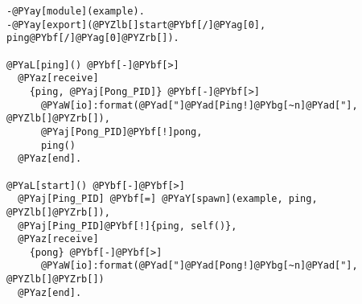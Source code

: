 \begin{Verbatim}[commandchars=@\[\]]
-@PYay[module](example).
-@PYay[export](@PYZlb[]start@PYbf[/]@PYag[0], ping@PYbf[/]@PYag[0]@PYZrb[]).

@PYaL[ping]() @PYbf[-]@PYbf[>]
  @PYaz[receive]
    {ping, @PYaj[Pong_PID]} @PYbf[-]@PYbf[>]
      @PYaW[io]:format(@PYad["]@PYad[Ping!]@PYbg[~n]@PYad["], @PYZlb[]@PYZrb[]),
      @PYaj[Pong_PID]@PYbf[!]pong,
      ping()
  @PYaz[end].

@PYaL[start]() @PYbf[-]@PYbf[>]
  @PYaj[Ping_PID] @PYbf[=] @PYaY[spawn](example, ping, @PYZlb[]@PYZrb[]),
  @PYaj[Ping_PID]@PYbf[!]{ping, self()},
  @PYaz[receive]
    {pong} @PYbf[-]@PYbf[>]
      @PYaW[io]:format(@PYad["]@PYad[Pong!]@PYbg[~n]@PYad["], @PYZlb[]@PYZrb[])
  @PYaz[end].
\end{Verbatim}
